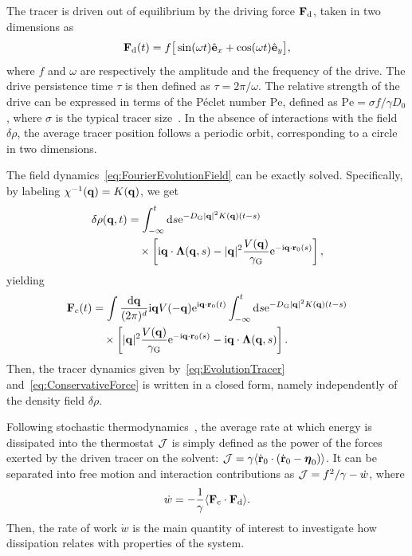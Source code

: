 \documentclass[pre, superscriptaddress, twocolumn,pre]{revtex4-1}
\newcommand{\dd}{\text{d}}
\newcommand{\ee}{\text{e}}
\newcommand{\ii}{\text{i}}
\begin{document}
The tracer is driven out of equilibrium by the driving force ${\bf F}_\text{d}$, taken in two dimensions as
\begin{equation}\label{eq:theta}
	{\bf F}_{\rm d}(t) = f \big[\sin(\omega t) \hat{\bf e}_x + \cos(\omega t)\hat{\bf e}_y \big] ,
\end{equation}
where $f$ and $\omega$ are respectively the amplitude and the frequency of the drive. The drive persistence time $\tau$ is then defined as $\tau=2\pi/\omega$. The relative strength of the drive can be expressed in terms of the P\'eclet number $\text{Pe}$, defined as $\text{Pe} = \sigma f/\gamma D_0$, where $\sigma$ is the typical tracer size~\cite{Han2016, delJunco2018}. In the absence of interactions with the field $\delta\rho$, the average tracer position follows a periodic orbit, corresponding to a circle in two dimensions.


The field dynamics~\eqref{eq:FourierEvolutionField} can be exactly solved. Specifically, by labeling $\chi^{-1}({\bf q}) = K({\bf q})$, we get
\begin{equation}
	\begin{aligned}
		\delta\rho({\bf q},t) &= \int_{-\infty}^t \dd s \ee^{-D_{\rm G} |{\bf q}|^2 K({\bf q})(t-s)}
		\\
		&\quad\times \left[ \ii{\bf q} \cdot {\boldsymbol\Lambda}({\bf q},s) - |{\bf q}|^2 \frac{V({\bf q})}{\gamma_{\rm G}} \ee^{-\ii {\bf q}\cdot {\bf r}_0(s)}\right] ,
	\end{aligned}
\end{equation}
yielding
\begin{equation}\label{eq:ConservativeForce}
	\begin{aligned}
		{\bf F}_\text{c}(t) &= \int \frac{\dd{\bf q}}{(2\pi)^d} \ii{\bf q} V(-{\bf q}) \ee^{\ii{\bf q} \cdot {\bf r}_0(t)} \int_{-\infty}^t \dd s \ee^{-D_{\rm G} |{\bf q}|^2 K({\bf q})(t-s)}
		\\
		&\quad\times \left[ |{\bf q}|^2 \frac{ V({\bf q})}{\gamma_{\rm G}} \ee^{-\ii{\bf q} \cdot {\bf r}_0(s)} - \ii{\bf q} \cdot {\bf\Lambda}({\bf q}, s) \right] .
	\end{aligned}
\end{equation}
Then, the tracer dynamics given by~\eqref{eq:EvolutionTracer} and~\eqref{eq:ConservativeForce} is written in a closed form, namely independently of the density field $\delta\rho$.


Following stochastic thermodynamics~\cite{Sekimoto1998, Seifert2012}, the average rate at which energy is dissipated into the thermostat $\cal J$ is simply defined as the power of the forces exerted by the driven tracer on the solvent: ${\cal J} = \gamma \langle\dot{\bf r}_0\cdot(\dot{\bf r}_0-{\boldsymbol\eta}_0)\rangle$. It can be separated into free motion and interaction contributions as ${\cal J} = f^2/\gamma - \dot w$, where
\begin{equation}\label{eq:work}
	\dot{w} = -\frac{1}{\gamma} \langle{\bf F}_\text{c}\cdot {\bf F}_\text{d}\rangle .
\end{equation}
Then, the rate of work $\dot w$ is the main quantity of interest to investigate how dissipation relates with properties of the system.
\end{document}
